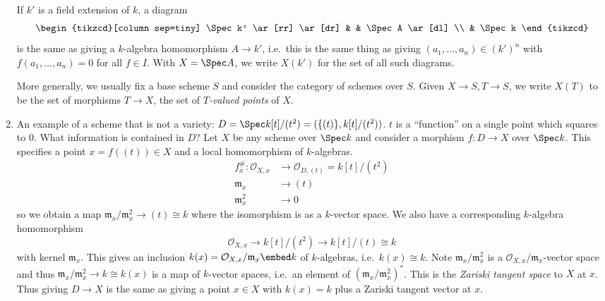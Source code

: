 \documentclass[a4paper]{article}
\newcommand{\sh}[1]{\mathcal{#1}} %
\begin{document}
\begin{eg}
\begin{enumerate}
    If \(k'\) is a field extension of \(k\), a diagram
    \[
      \begin{tikzcd}[column sep=tiny]
        \Spec k' \ar[rr] \ar[dr] & & \Spec A \ar[dl] \\
        & \Spec k
      \end{tikzcd}
    \]
    is the same as giving a \(k\)-algebra homomorphism \(A \to k'\), i.e.\ this is the same thing as giving \((a_1, \dots, a_n) \in (k')^n\) with \(f(a_1, \dots, a_n) = 0\) for all \(f \in I\). With \(X = \Spec A\), we write \(X(k')\) for the set of all such diagrams.

    More generally, we usually fix a base scheme \(S\) and consider the category of schemes over \(S\). Given \(X \to S, T \to S\), we write \(X(T)\) to be the set of morphisms \(T \to X\), the set of \emph{\(T\)-valued points} of \(X\).
  \item An example of a scheme that is not a variety: \(D = \Spec k[t]/(t^2) = (\{(t)\}, k[t]/(t^2))\). \(t\) is a ``function'' on a single point which squares to \(0\). What information is contained in \(D\)? Let \(X\) be any scheme over \(\Spec k\) and consider a morphism \(f: D \to X\) over \(\Spec k\). This specifies a point \(x = f((t)) \in X\) and a local homomorphism of \(k\)-algebras.
    \begin{align*}
      f_x^\#: \sh O_{X, x} &\to \sh O_{D, (t)} = k[t]/(t^2) \\
      \mathfrak m_x &\to (t) \\
      \mathfrak m_x^2 &\to 0
    \end{align*}
    so we obtain a map \(\mathfrak m_x/\mathfrak m_x^2 \to (t) \cong k\) where the isomorphism is as a \(k\)-vector space. We also have a corresponding \(k\)-algebra homomorphism
    \[
      \sh O_{X, x} \to k[t]/(t^2) \to k[t]/(t) \cong k
    \]
    with kernel \(\mathfrak m_x\). This gives an inclusion \(k(x) = \sh O_{X, x}/\mathfrak m_x \embed k\) of \(k\)-algebras, i.e.\ \(k(x) \cong k\). Note \(\mathfrak m_x/\mathfrak m_x^2\) is a \(\sh O_{X, x}/\mathfrak m_x\)-vector space and thus \(\mathfrak m_x/\mathfrak m_x^2 \to k \cong k(x)\) is a map of \(k\)-vector spaces, i.e.\ an element of \((\mathfrak m_x/\mathfrak m_x^2)^*\). This is the \emph{Zariski tangent space} to \(X\) at \(x\). Thus giving \(D \to X\) is the same as giving a point \(x \in X\) with \(k(x) = k\) plus a Zariski tangent vector at \(x\).
  \end{enumerate}
\end{eg}
\end{document}
